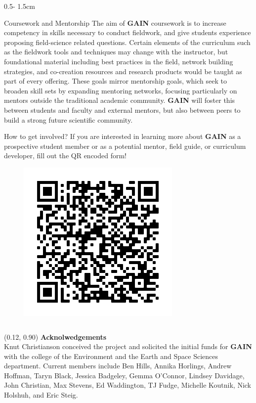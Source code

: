 \documentclass{uwposter}
\begin{document}
\begin{frame}
\begin{columns}[onlytextwidth]
\begin{column}{0.5\textwidth - 1.5cm}
    \begin{block}{Coursework and Mentorship}
        The aim of  \textbf{\alert{GAIN}} coursework is to increase competency in skills necessary to conduct fieldwork, and give students experience proposing field-science related questions. Certain elements of the curriculum such as the fieldwork tools and techniques may change with the instructor, but foundational material including best practices in the field, network building strategies, and co-creation resources and research products would be taught as part of every offering. These goals mirror mentorship goals, which seek to broaden skill sets by expanding mentoring networks, focusing particularly on mentors outside the traditional academic community. \textbf{\alert{GAIN}}  will foster this between students and faculty and external mentors, but also between peers to build a strong future scientific community. 

    \end{block}
    
    \begin{alertblock}{How to get involved?}
        If you are interested in learning more about \textbf{\alert{GAIN}} as a prospective student member or as a potential mentor, field guide, or curriculum developer, fill out the QR encoded form!
        \begin{figure}
        \includegraphics[width=.4\linewidth]{uwposter-images/frame.png}
        \label{fig:qrcode}
        \end{figure}
        
    \end{alertblock}
    
    
    \end{column}


\end{columns}


\begin{textblock}{0.76}(0.12, 0.90)
    \color{white}
    \sffamily
    \textbf{Acknolwedgements}
    \\
    Knut Christianson conceived the project and solicited the initial funds for \textbf{\alert{GAIN}} with the college of the Environment and the Earth and Space Sciences department.  
    Current members include Ben Hills, Annika Horlings, Andrew Hoffman, Taryn Black, Jessica Badgeley, Gemma O'Connor, Lindsey Davidage, John Christian,  Max Stevens, Ed Waddington, TJ Fudge, Michelle Koutnik, Nick Holshuh, and Eric Steig.
    \end{textblock}


\end{frame}
\end{document}
